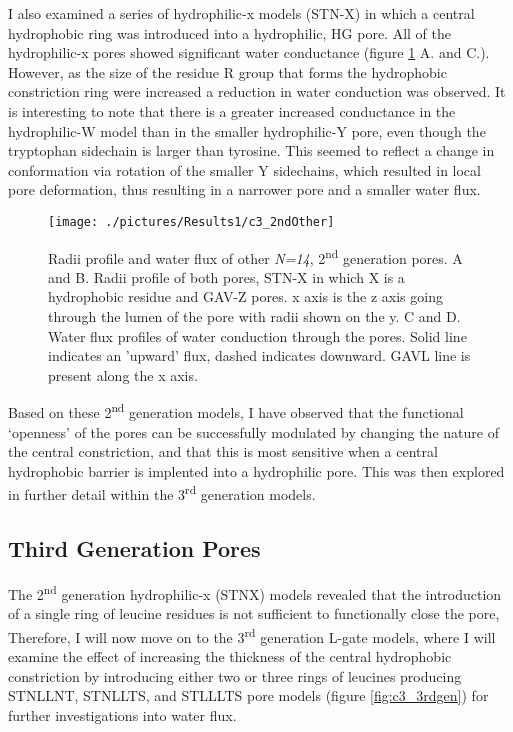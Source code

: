 I also examined a series of hydrophilic-x models (STN-X) in which a central hydrophobic ring was introduced into a hydrophilic, HG pore. All of the hydrophilic-x pores showed significant water conductance (figure \ref{fig:c3_2ndOther} A. and C.). However, as the size of the residue R group that  forms the hydrophobic constriction ring were increased a reduction in water conduction was observed. It is interesting to note that there is a greater increased conductance in the hydrophilic-W model than in the smaller hydrophilic-Y pore, even though the tryptophan sidechain is larger than tyrosine. This seemed to reflect a change in conformation via rotation of the smaller Y sidechains, which resulted in local pore deformation, thus resulting in a narrower pore and a smaller water flux. 


\begin{figure}[H]
\begin{center}
\texttt{[image: ./pictures/Results1/c3\_2ndOther]}
\caption[Radii profile and water flux of other \textit{N=14}, 2\textsuperscript{nd} generation pores.] {Radii profile and water flux of other \textit{N=14}, 2\textsuperscript{nd} generation pores. A and B. Radii profile of both pores, STN-X in which X is a hydrophobic residue and GAV-Z pores. x axis is the z axis going through the lumen of the pore with radii shown on the y. C and D. Water flux profiles of water conduction through the pores. Solid line indicates an 'upward' flux, dashed indicates downward. GAVL line is present along the x axis.}
\label{fig:c3_2ndOther}
\end{center}
\end{figure}

Based on these 2\textsuperscript{nd} generation models, I have observed that the functional ‘openness’ of the pores can be successfully modulated by changing the nature of the central constriction, and that this is most sensitive when a central hydrophobic barrier is implented into a hydrophilic pore. This was then explored in further detail within the 3\textsuperscript{rd} generation models.

\subsection{Third Generation Pores}

The 2\textsuperscript{nd} generation hydrophilic-x (STNX) models revealed that the introduction of a single ring of leucine residues is not sufficient to functionally close the pore, Therefore, I will now move on to the 3\textsuperscript{rd} generation L-gate models, where I will examine the effect of increasing the thickness of the central hydrophobic constriction by introducing either two or three rings of leucines producing STNLLNT, STNLLTS, and STLLLTS pore models (figure \ref{fig:c3_3rdgen}) for further investigations into water flux.

